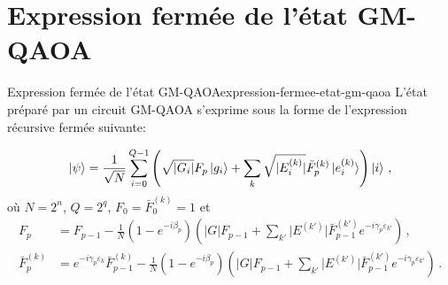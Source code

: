 \begin{comment}
\end{comment}


\chapter{Expression fermée de l'état GM-QAOA}
\label{ann:auto-reductibilite-du-circuit-gm-qaoa}


\begin{maintheorem}{Expression fermée de l'état GM-QAOA}{expression-fermee-etat-gm-qaoa}
    L'état préparé par un circuit GM-QAOA s'exprime sous la forme de l'expression récursive fermée suivante:

    \begin{equation}
        \label{eq:recursive-formula}
        \ket{\psi} = \frac{1}{\sqrt{ N }} \sum_{i=0}^{Q-1} \left( \sqrt{ \lvert G_{i} \rvert } F_{p} \ket{g_{i}} + \sum_{k} \sqrt{ \lvert E^{(k)}_{i} \rvert } \bar{F}^{(k)}_{p} \ket{e^{(k)}_{i}} \right) \ket{i} \,,
    \end{equation}
    où $N=2^{n}$, $Q=2^{q}$, $F_{0}=\bar{F}_{0}^{(k)}=1$ et
    \begin{align*}
        F_{p} &= F_{p-1} - \frac{1}{N} (1-e^{-i\beta_{p}}) \left( \lvert G \rvert   F_{p-1} + \sum_{k'} \lvert E^{(k')} \rvert \bar{F}^{(k')}_{p-1} e^{-i\gamma_{p}\varepsilon_{k'}} \right) \,, \\
        \bar{F}^{(k)}_{p} &= e^{-i\gamma_{p} \varepsilon_{k}}\bar{F}_{p-1}^{(k)} - \frac{1}{N} (1-e^{-i\beta_{p}}) \left( \lvert G \rvert   F_{p-1} + \sum_{k'} \lvert E^{(k')} \rvert \bar{F}^{(k')}_{p-1} e^{-i\gamma_{p}\varepsilon_{k'}} \right) \,.
    \end{align*}
\end{maintheorem}

